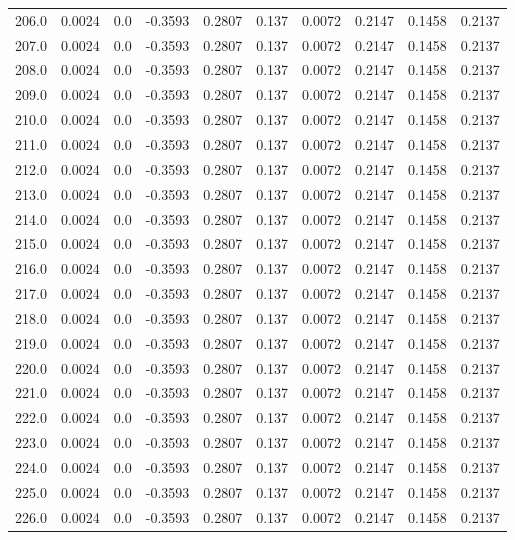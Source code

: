 \begin{longtable}{lrrrrrrrrr}
206.0 & 0.0024 & 0.0 & -0.3593 & 0.2807 & 0.137 & 0.0072 & 0.2147 & 0.1458 & 0.2137 \\
207.0 & 0.0024 & 0.0 & -0.3593 & 0.2807 & 0.137 & 0.0072 & 0.2147 & 0.1458 & 0.2137 \\
208.0 & 0.0024 & 0.0 & -0.3593 & 0.2807 & 0.137 & 0.0072 & 0.2147 & 0.1458 & 0.2137 \\
209.0 & 0.0024 & 0.0 & -0.3593 & 0.2807 & 0.137 & 0.0072 & 0.2147 & 0.1458 & 0.2137 \\
210.0 & 0.0024 & 0.0 & -0.3593 & 0.2807 & 0.137 & 0.0072 & 0.2147 & 0.1458 & 0.2137 \\
211.0 & 0.0024 & 0.0 & -0.3593 & 0.2807 & 0.137 & 0.0072 & 0.2147 & 0.1458 & 0.2137 \\
212.0 & 0.0024 & 0.0 & -0.3593 & 0.2807 & 0.137 & 0.0072 & 0.2147 & 0.1458 & 0.2137 \\
213.0 & 0.0024 & 0.0 & -0.3593 & 0.2807 & 0.137 & 0.0072 & 0.2147 & 0.1458 & 0.2137 \\
214.0 & 0.0024 & 0.0 & -0.3593 & 0.2807 & 0.137 & 0.0072 & 0.2147 & 0.1458 & 0.2137 \\
215.0 & 0.0024 & 0.0 & -0.3593 & 0.2807 & 0.137 & 0.0072 & 0.2147 & 0.1458 & 0.2137 \\
216.0 & 0.0024 & 0.0 & -0.3593 & 0.2807 & 0.137 & 0.0072 & 0.2147 & 0.1458 & 0.2137 \\
217.0 & 0.0024 & 0.0 & -0.3593 & 0.2807 & 0.137 & 0.0072 & 0.2147 & 0.1458 & 0.2137 \\
218.0 & 0.0024 & 0.0 & -0.3593 & 0.2807 & 0.137 & 0.0072 & 0.2147 & 0.1458 & 0.2137 \\
219.0 & 0.0024 & 0.0 & -0.3593 & 0.2807 & 0.137 & 0.0072 & 0.2147 & 0.1458 & 0.2137 \\
220.0 & 0.0024 & 0.0 & -0.3593 & 0.2807 & 0.137 & 0.0072 & 0.2147 & 0.1458 & 0.2137 \\
221.0 & 0.0024 & 0.0 & -0.3593 & 0.2807 & 0.137 & 0.0072 & 0.2147 & 0.1458 & 0.2137 \\
222.0 & 0.0024 & 0.0 & -0.3593 & 0.2807 & 0.137 & 0.0072 & 0.2147 & 0.1458 & 0.2137 \\
223.0 & 0.0024 & 0.0 & -0.3593 & 0.2807 & 0.137 & 0.0072 & 0.2147 & 0.1458 & 0.2137 \\
224.0 & 0.0024 & 0.0 & -0.3593 & 0.2807 & 0.137 & 0.0072 & 0.2147 & 0.1458 & 0.2137 \\
225.0 & 0.0024 & 0.0 & -0.3593 & 0.2807 & 0.137 & 0.0072 & 0.2147 & 0.1458 & 0.2137 \\
226.0 & 0.0024 & 0.0 & -0.3593 & 0.2807 & 0.137 & 0.0072 & 0.2147 & 0.1458 & 0.2137 \\

\end{longtable}
